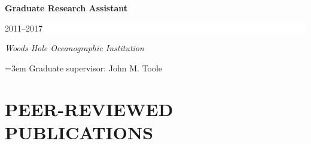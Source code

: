 \documentclass[paper=letter,fontsize=11pt]{scrartcl} %
\newcommand{\sepspace}{\vspace*{3mm}}		%
\newcommand{\NewPart}[2]{\section*{\uppercase{#1} #2}}
\newcommand{\EducationEntry}[4]{
		\noindent \textbf{#1} \hfill      %
		\colorbox{White}{%
			\parbox{8em}{%
			\hfill\color{Black}#2}} \par  %
		\noindent \textit{#3} \par        %
		\noindent\hangindent=3em\hangafter=0 #4 %
		 \par}
\begin{document}


\sepspace

\EducationEntry{Graduate Research Assistant}{2011--2017}{Woods Hole Oceanographic Institution}
{Graduate supervisor: John M. Toole}






\NewPart{Peer-reviewed publications}{}
\end{document}

